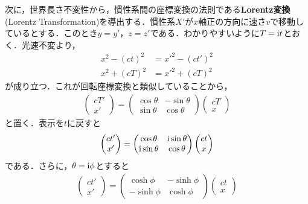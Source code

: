 \documentclass{report}
\begin{document}
  次に，世界長さ不変性から，慣性系間の座標変換の法則である\textbf{Lorentz変換}(Lorentz Transformation)を導出する．慣性系$X'$が$x$軸正の方向に速さ$v$で移動しているとする．このとき$y=y'，z=z'$である．わかりやすいように$T=\mathrm{i} t$とおく．光速不変より，
  \begin{align}
    x^2 - (ct)^2 &= x'^2 - (ct')^2\\
    x^2 + (cT)^2 &= x'^2 + (cT)^2
  \end{align}
  が成り立つ．これが回転座標変換と類似していることから，
  \begin{align}
    \begin{pmatrix}
      cT' \\ x'
    \end{pmatrix}
    =
    \begin{pmatrix}
      \cos\theta & -\sin\theta\\
      \sin\theta & \cos\theta
    \end{pmatrix}
    \begin{pmatrix}
      cT\\x
    \end{pmatrix}
  \end{align}
  と置く．表示を$t$に戻すと
  \begin{align}
    \begin{pmatrix}
      ct' \\ x'
    \end{pmatrix}
    =
    \begin{pmatrix}
      \cos\theta & \mathrm{i}\sin\theta\\
      \mathrm{i}\sin\theta & \cos\theta
    \end{pmatrix}
    \begin{pmatrix}
      ct\\x
    \end{pmatrix}
  \end{align}
  である．さらに，$\theta = \mathrm{i}\phi$とすると
  \begin{align}
    \begin{pmatrix}
      ct' \\ x'
    \end{pmatrix}
    =
    \begin{pmatrix}
      \cosh\phi & -\sinh\phi\\
      -\sinh\phi & \cosh\phi
    \end{pmatrix}
    \begin{pmatrix}
      ct\\x
    \end{pmatrix}
  \end{align}
\end{document}
